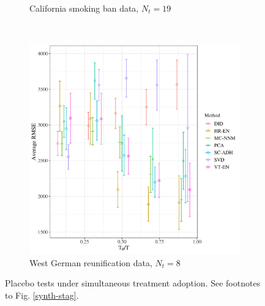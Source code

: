 \documentclass[12pt]{article}
\begin{document}
\begin{figure}[htbp]
\begin{subfigure}[t]{0.45\textwidth}
		\caption{California smoking ban data, $N_t = 19$}
	\end{subfigure}
	~
	\begin{subfigure}[t]{0.45\textwidth}
		\centering
		\includegraphics[width=\textwidth]{plots/germany_N_16_T_44_numruns_20_num_treated_8_simultaneuous_1.png}
		\caption{West German reunification data, $N_t = 8$} 
	\end{subfigure}
	\caption{Placebo tests under simultaneous treatment adoption. See footnotes to Fig. \ref{synth-stag}. \label{synth-sim}} 
\end{figure}
\end{document}
